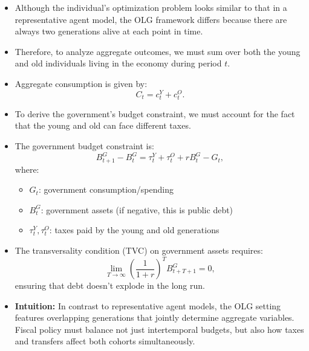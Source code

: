 \documentclass[12pt]{article}
\begin{document}
\begin{itemize}
\item Although the individual’s optimization problem looks similar to that in a representative agent model, the OLG framework differs because there are always two generations alive at each point in time.

\item Therefore, to analyze aggregate outcomes, we must sum over both the young and old individuals living in the economy during period \( t \).

\item Aggregate consumption is given by:
\[
C_t = c_t^Y + c_t^O.
\]

\item To derive the government’s budget constraint, we must account for the fact that the young and old can face different taxes.

\item The government budget constraint is:
\[
B_{t+1}^G - B_t^G = \tau_t^Y + \tau_t^O + r B_t^G - G_t, \tag{19}
\]
where:
\begin{itemize}
    \item \( G_t \): government consumption/spending
    \item \( B_t^G \): government assets (if negative, this is public debt)
    \item \( \tau_t^Y, \tau_t^O \): taxes paid by the young and old generations
\end{itemize}

\item The transversality condition (TVC) on government assets requires:
\[
\lim_{T \to \infty} \left( \frac{1}{1 + r} \right)^T B_{t+T+1}^G = 0,
\]
ensuring that debt doesn't explode in the long run.

\item \textbf{Intuition:} In contrast to representative agent models, the OLG setting features overlapping generations that jointly determine aggregate variables. Fiscal policy must balance not just intertemporal budgets, but also how taxes and transfers affect both cohorts simultaneously.
\end{itemize}
\end{document}
